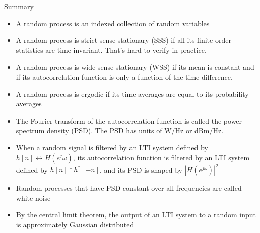 \documentclass[10pt]{beamer}
\begin{document}
\begin{frame}{Summary}
\begin{itemize}
	\item A random process is an indexed collection of random variables
	\item A random process is strict-sense stationary (SSS) if all its finite-order statistics are time invariant. That's hard to verify in practice.
	\item A random process is wide-sense stationary (WSS) if its mean is constant and if its autocorrelation function is only a function of the time difference. 
	\item A random process is ergodic if its time averages are equal to its probability averages
	\item The Fourier transform of the autocorrelation function is called the power spectrum density (PSD). The PSD has units of W/Hz or dBm/Hz.
	\item When a random signal is filtered by an LTI system defined by $h[n]\leftrightarrow H(e^j\omega)$, its autocorrelation function is filtered by an LTI system defined by $h[n]\ast h^*[-n]$, and its PSD is shaped by $|H(e^{j\omega})|^2$
	\item Random processes that have PSD constant over all frequencies are called white noise
	\item By the central limit theorem, the output of an LTI system to a random input is approximately Gaussian distributed
	
\end{itemize}
\end{frame}
\end{document}
